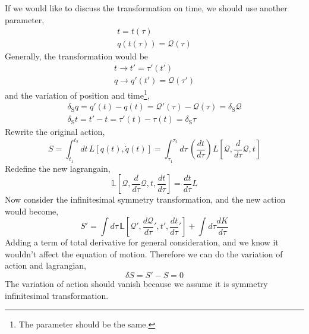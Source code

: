 \documentclass[12pt]{article}
\numberwithin{equation}{section}
\begin{document}
If we would like to discuss the transformation on time, we should use another parameter,
\begin{equation}
    \begin{split}
        t = t(\tau)\\
        q(t(\tau)) = \mathcal{Q}(\tau)
    \end{split}
\end{equation}
Generally, the transformation would be
\begin{equation}
    \begin{split}
        t\rightarrow t' = \tau'(t')\\
        q\rightarrow q'(t') = \mathcal{Q}(\tau')
    \end{split}
\end{equation}
and the variation of position and time\footnote{The parameter should be the same.},
\begin{equation}
    \begin{split}
        \delta_{\text{S}}q = q'(t)-q(t) =\mathcal{Q}'(\tau) - \mathcal{Q}(\tau)= \delta_{\text{S}}\mathcal{Q}\\
        \delta_{\text{S}}t = t'-t = \tau'(t) -\tau(t) = \delta_{\text{S}}\tau
    \end{split}
\end{equation}
Rewrite the original action,
\begin{equation}
    S = \int_{t_1}^{t_2}{dt\,L[q(t), \dot{q}(t)]} = \int_{\tau_1}^{\tau_2}{d\tau\,\left(\frac{dt}{d\tau}\right)L[\mathcal{Q}, \frac{d}{d\tau}\mathcal{Q}, t]}
\end{equation}
Redefine the new lagrangain,
\begin{equation}
    \mathbb{L}\left[\mathcal{Q}, \frac{d}{d\tau}\mathcal{Q},t,\frac{dt}{d\tau}\right] = \frac{dt}{d\tau}L
\end{equation}
Now consider the infinitesimal symmetry transformation, and the new action would become,
\begin{equation}
    S' = \int{d\tau\,\mathbb{L}\left[\mathcal{Q}', \frac{d\mathcal{Q}}{d\tau}', t',\frac{dt}{d\tau}'\right]} + \int{d\tau\frac{dK}{d\tau}}
\end{equation}
Adding a term of total derivative for general consideration, and we know it wouldn't affect the equation of motion.
Therefore we can do the variation of action and lagrangian,
\begin{equation}
    \delta S = S' - S = 0
\end{equation}
The variation of action should vanish because we assume it is symmetry infinitesimal transformation.
\end{document}
